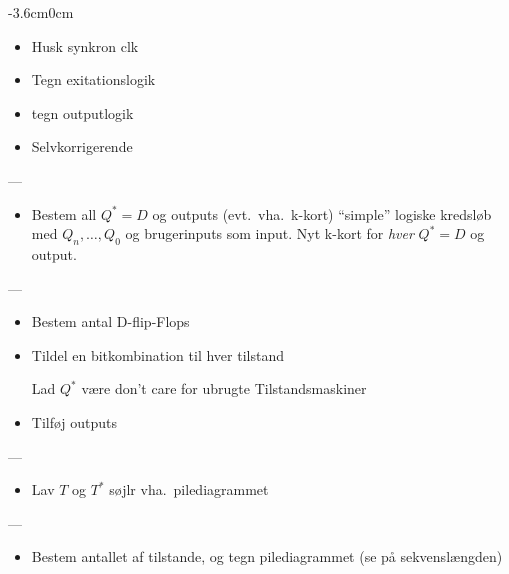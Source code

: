\begin{changemargin}{-3.6cm}{0cm}
{\begin{itemize}
	\item Husk synkron clk
	\item Tegn exitationslogik
	\item tegn outputlogik
	\item Selvkorrigerende
    \end{itemize}
    ---
    \begin{itemize}
	\item Bestem all $Q^*=D$ og outputs (evt.\ vha.\ k-kort) ``simple'' logiske kredsløb med $Q_n,\ldots,Q_0$ og brugerinputs som input. Nyt k-kort for \emph{hver} $Q^*=D$ og output.
    \end{itemize}
    ---
    \begin{itemize}
	\item Bestem antal D-flip-Flops
	\item Tildel en bitkombination til hver tilstand

	    Lad $Q^*$ være don't care for ubrugte Tilstandsmaskiner
	\item Tilføj outputs
    \end{itemize}
    ---
    \begin{itemize}
	\item Lav $T$ og $T^*$ søjlr vha.\ pilediagrammet
    \end{itemize}
    ---
    \begin{itemize}
	\item Bestem antallet af tilstande, og tegn pilediagrammet (se på sekvenslængden)
    \end{itemize}
}
\nolinebreak
\parbox{.5cm}{\ }
\nolinebreak
\parbox{.4in}{
}

\end{changemargin}
